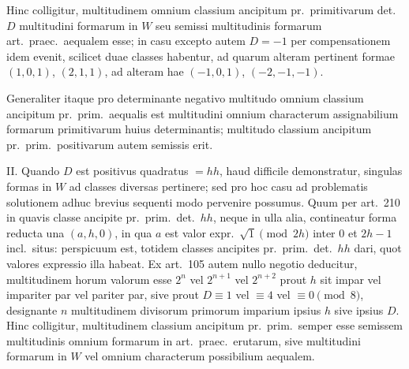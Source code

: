 \documentclass[12pt,a4paper]{article}
\theoremstyle{plain}
\theoremstyle{definition}
\theoremstyle{remark}
\theoremstyle{problemstyle}
\begin{document}
Hinc colligitur, multitudinem omnium classium ancipitum pr.\ primitivarum det.\ $D$ multitudini formarum in $W$ seu semissi multitudinis formarum art.\ praec.\ aequalem esse; in casu excepto autem $D = -1$ per compensationem idem evenit, scilicet duae classes habentur, ad quarum alteram pertinent formae $(1, 0, 1)$, $(2, 1, 1)$, ad alteram hae $(-1, 0, 1)$, $(-2, -1, -1)$.

Generaliter itaque pro determinante negativo multitudo omnium classium ancipitum pr.\ prim.\ aequalis est multitudini omnium characterum assignabilium formarum primitivarum huius determinantis; multitudo classium ancipitum pr.\ prim.\ positivarum autem semissis erit.

II. Quando $D$ est positivus quadratus $= hh$, haud difficile demonstratur, singulas formas in $W$ ad classes diversas pertinere; sed pro hoc casu ad problematis solutionem adhuc brevius sequenti modo pervenire possumus. Quum per art.\ 210 in quavis classe ancipite pr.\ prim.\ det.\ $hh$, neque in ulla alia, contineatur forma reducta una $(a, h, 0)$, in qua $a$ est valor expr.\ $\sqrt{1} \pmod{2h}$ inter $0$ et $2h - 1$ incl.\ situs: perspicuum est, totidem classes ancipites pr.\ prim.\ det.\ $hh$ dari, quot valores expressio illa habeat. Ex art.\ 105 autem nullo negotio deducitur, multitudinem horum valorum esse $2^n$ vel $2^{n+1}$ vel $2^{n+2}$ prout $h$ sit impar vel impariter par vel pariter par, sive prout $D \equiv 1$ vel $\equiv 4$ vel $\equiv 0 \pmod{8}$, designante $n$ multitudinem divisorum primorum imparium ipsius $h$ sive ipsius $D$. Hinc colligitur, multitudinem classium ancipitum pr.\ prim.\ semper esse semissem multitudinis omnium formarum in art.\ praec.\ erutarum, sive multitudini formarum in $W$ vel omnium characterum possibilium aequalem.
\end{document}
